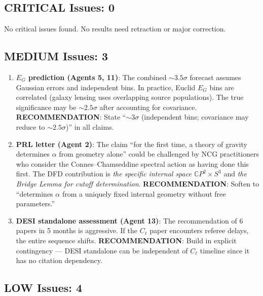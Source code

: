 \documentclass[11pt,a4paper]{article}
\newcommand{\CP}{\mathbb{C}P}
\begin{document}
\subsection{CRITICAL Issues: 0}

No critical issues found. No results need retraction or major correction.

\subsection{MEDIUM Issues: 3}

\begin{enumerate}
\item \textbf{$E_G$ prediction (Agents 5, 11)}: The combined $\sim 3.5\sigma$ forecast assumes Gaussian errors and independent bins. In practice, Euclid $E_G$ bins are correlated (galaxy lensing uses overlapping source populations). The true significance may be $\sim 2.5\sigma$ after accounting for covariance. \textbf{RECOMMENDATION}: State ``$\sim 3\sigma$ (independent bins; covariance may reduce to $\sim 2.5\sigma$)'' in all claims.

\item \textbf{PRL letter (Agent 2)}: The claim ``for the first time, a theory of gravity determines $\alpha$ from geometry alone'' could be challenged by NCG practitioners who consider the Connes--Chamseddine spectral action as having done this first. The DFD contribution is \textit{the specific internal space $\CP^2 \times S^3$} and \textit{the Bridge Lemma for cutoff determination}. \textbf{RECOMMENDATION}: Soften to ``determines $\alpha$ from a uniquely fixed internal geometry without free parameters.''

\item \textbf{DESI standalone assessment (Agent 13)}: The recommendation of 6 papers in 5 months is aggressive. If the $C_\ell$ paper encounters referee delays, the entire sequence shifts. \textbf{RECOMMENDATION}: Build in explicit contingency --- DESI standalone can be independent of $C_\ell$ timeline since it has no citation dependency.
\end{enumerate}

\subsection{LOW Issues: 4}
\end{document}
